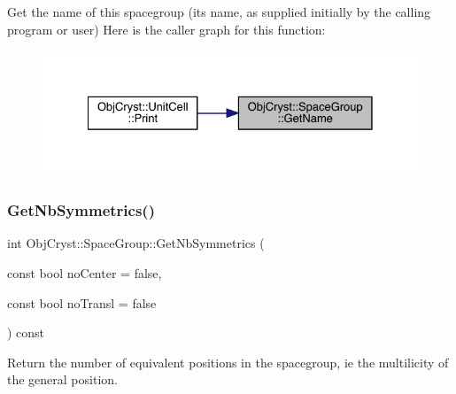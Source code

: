 Get the name of this spacegroup (its name, as supplied initially by the calling program or user) Here is the caller graph for this function\+:
\nopagebreak
\begin{figure}[H]
\begin{center}
\leavevmode
\includegraphics[width=328pt]{class_obj_cryst_1_1_space_group_a4b8bd009db507295c21fa88ad154a8a6_icgraph}
\end{center}
\end{figure}
\mbox{\label{class_obj_cryst_1_1_space_group_a3790c6c41b59e2584c48f62ab1766bec}} 
\subsubsection{\texorpdfstring{GetNbSymmetrics()}{GetNbSymmetrics()}}
{\footnotesize\ttfamily int Obj\+Cryst\+::\+Space\+Group\+::\+Get\+Nb\+Symmetrics (\begin{DoxyParamCaption}\item[{const bool}]{no\+Center = {\ttfamily false},  }\item[{const bool}]{no\+Transl = {\ttfamily false} }\end{DoxyParamCaption}) const}



Return the number of equivalent positions in the spacegroup, ie the multilicity of the general position. 


